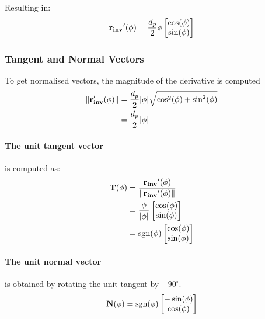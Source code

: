 Resulting in:
\begin{equation}
    \vb{r_{inv}}'(\phi) = \frac{d_p}{2}\phi\begin{bmatrix}\cos(\phi)\\\sin(\phi)\end{bmatrix}
\end{equation}

\subsubsection{Tangent and Normal Vectors}
To get normalised vectors, the magnitude of the derivative is computed
\begin{subequations}
\begin{align}
    \norm{\vb{r_{inv}'}(\phi)}  &= \frac{d_p}{2}\abs{\phi}\sqrt{\cos^2(\phi) + \sin^2(\phi)} \\
                                &= \frac{d_p}{2}\abs{\phi}
\end{align}
\end{subequations}

\paragraph{The unit tangent vector} is computed as:
\begin{subequations}
\begin{align}
    \vb{T}(\phi)    &= \frac{\vb{r_{inv}}'(\phi)}{\norm{\vb{r_{inv}}'(\phi)}}\\
                    &= \frac{\phi}{\abs{\phi}}\begin{bmatrix}\cos(\phi)\\\sin(\phi)\end{bmatrix}\\
                    &= \operatorname{sgn}(\phi) \begin{bmatrix}\cos(\phi)\\\sin(\phi)\end{bmatrix}
\end{align}
\end{subequations}

\paragraph{The unit normal vector} is obtained by rotating the unit tangent by $+90^\circ$.
\begin{equation}
    \vb{N}(\phi) = \operatorname{sgn}(\phi)\begin{bmatrix}-\sin(\phi)\\\cos(\phi)\end{bmatrix}
\end{equation}

